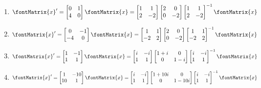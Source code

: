 \begin{enumerate}[label=(\alph*)]
\item\label{itm : Quiz20 a} $\displaystyle \fontMatrix{x}' = \begin{bmatrix}0&1\\4&0\end{bmatrix} \fontMatrix{x} = \begin{bmatrix}1&1\\2&-2\end{bmatrix} \begin{bmatrix}2&0\\0&-2\end{bmatrix} \begin{bmatrix}1&1\\2&-2\end{bmatrix}^{-1} \fontMatrix{x}$
\item\label{itm : Quiz20 b} $\displaystyle \fontMatrix{x}' = \begin{bmatrix}0&-1\\-4&0\end{bmatrix} \fontMatrix{x} = \begin{bmatrix}1&1\\-2&2\end{bmatrix} \begin{bmatrix}2&0\\0&-2\end{bmatrix} \begin{bmatrix}1&1\\-2&2\end{bmatrix}^{-1} \fontMatrix{x}$
\item\label{itm : Quiz20 c} $\displaystyle \fontMatrix{x}' = \begin{bmatrix}1&-1\\1&1\end{bmatrix} \fontMatrix{x} = \begin{bmatrix}i&-i\\1&1\end{bmatrix} \begin{bmatrix}1 + i&0\\0&1 - i\end{bmatrix} \begin{bmatrix}i&-i\\1&1\end{bmatrix}^{-1} \fontMatrix{x}$
\item\label{itm : Quiz20 d} $\displaystyle \fontMatrix{x}' = \begin{bmatrix}1&-10\\10&1\end{bmatrix} \fontMatrix{x} = \begin{bmatrix}i&-i\\1&1\end{bmatrix} \begin{bmatrix}1 + 10 i&0\\0&1 - 10 i\end{bmatrix} \begin{bmatrix}i&-i\\1&1\end{bmatrix}^{-1} \fontMatrix{x}$

\end{enumerate}
